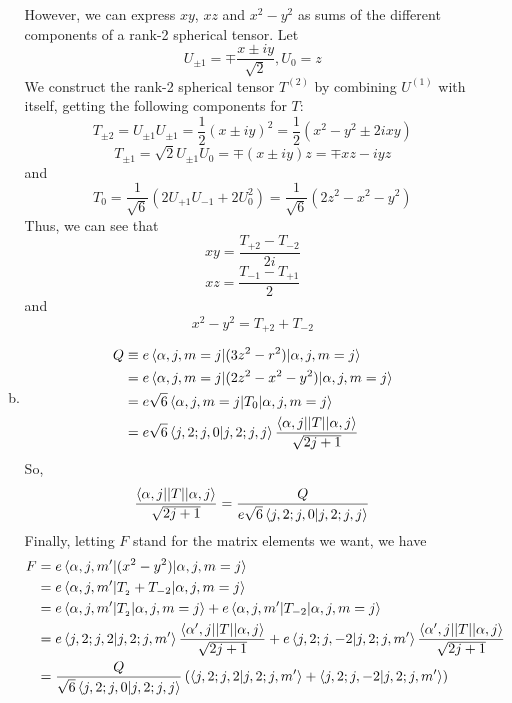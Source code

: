 \documentclass[12pt, letterpaper]{article}
\begin{document}
\begin{enumerate}
\begin{enumerate}[(a)]
However, we can express $xy$, $xz$ and $x^2-y^2$ as sums of the different components of a rank-2 spherical tensor. Let 
\begin{equation}
    U_{\pm 1}=\mp\frac{x\pm iy}{\sqrt{2}},U_0=z
\end{equation}
We construct the rank-2 spherical tensor $T^{(2)}$ by combining $U^{(1)}$ with itself, getting the following components for $T$:
\begin{equation}
    T_{\pm 2}=U_{\pm 1}U_{\pm 1}=\frac{1}{2}\left(x\pm iy\right)^2=\frac{1}{2}\left(x^2-y^2\pm 2ixy\right)
\end{equation}
\begin{equation}
    T_{\pm 1}=\sqrt{2}U_{\pm 1}U_0=\mp \left(x\pm iy\right)z=\mp xz-iyz
\end{equation}
and 
\begin{equation}
    T_0=\frac{1}{\sqrt{6}}\left(2U_{+1}U_{-1}+2U_0^2\right)=\frac{1}{\sqrt{6}}\left(2z^2-x^2-y^2\right)
\end{equation}
Thus, we can see that
\begin{equation}
    xy=\frac{T_{+2}-T_{-2}}{2i}
\end{equation}
\begin{equation}
xz=\frac{T_{-1}-T_{+1}}{2}
\end{equation}
and 
\begin{equation}
x^2-y^2=T_{+2}+T_{-2}
\end{equation}
\item 
\begin{align}
        Q&\equiv e\braket{\alpha,j,m=j|(3z^2-r^2)|\alpha,j,m=j}\\&=e\braket{\alpha,j,m=j|(2z^2-x^2-y^2)|\alpha,j,m=j}\\&=e\sqrt{6}\braket{\alpha,j,m=j|T_0|\alpha,j,m=j}\\&=e\sqrt{6}\braket{j,2;j,0|j,2;j,j}\frac{\braket{\alpha,j||T||\alpha,j}}{\sqrt{2j+1}}
\end{align}
So, 
\begin{equation}
        \frac{\braket{\alpha,j||T||\alpha,j}}{\sqrt{2j+1}}=\frac{Q}{e\sqrt{6}\braket{j,2;j,0|j,2;j,j}}
\end{equation}
Finally, letting $F$ stand for the matrix elements we want, we have
\begin{align}
        F&=e\braket{\alpha,j,m'|(x^2-y^2)|\alpha,j,m=j}\\&=e\braket{\alpha,j,m'|T_{_2}+T_{-2}|\alpha,j,m=j}\\&=e\braket{\alpha,j,m'|T_{_2}|\alpha,j,m=j}+e\braket{\alpha,j,m'|T_{-2}|\alpha,j,m=j}\\&=e\braket{j,2;j,2|j,2;j,m'}\frac{\braket{\alpha',j||T||\alpha,j}}{\sqrt{2j+1}}+e\braket{j,2;j,-2|j,2;j,m'}\frac{\braket{\alpha',j||T||\alpha,j}}{\sqrt{2j+1}}\\&=\frac{Q}{\sqrt{6}\braket{j,2;j,0|j,2;j,j}}\left(\braket{j,2;j,2|j,2;j,m'}+\braket{j,2;j,-2|j,2;j,m'}\right)
\end{align}


\end{enumerate}
\end{enumerate}
\end{document}
